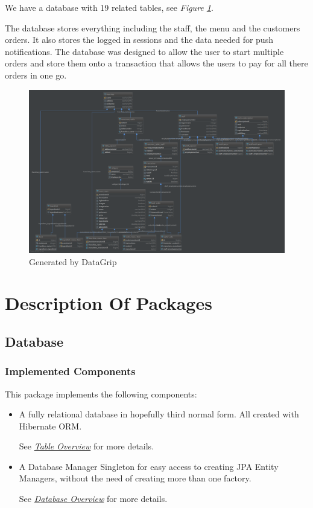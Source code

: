 \documentclass[12pt, twoside, a4paper]{report}
\begin{document}
We have a database with 19 related tables, see \textit{Figure \ref{fig:data}}. 

The database stores everything including the staff, the menu and the customers orders. 
It also stores the logged in sessions and the data needed for push notifications.
The database was designed to allow the user to start multiple orders and store them onto a transaction that allows the users to pay for all there orders in one go.

\begin{figure}[H]
  \centering
  \includegraphics[width=15cm]{database.png}
  \caption{Generated by DataGrip}
  \label{fig:data}
\end{figure}

\chapter*{Description Of Packages}
\section*{Database}\label{sec:database}
\subsection*{Implemented Components}
This package implements the following components:
\begin{itemize}
  \item A fully relational database in hopefully third normal form. All created with Hibernate ORM.

    See \textit{\href{run:../JavaDoc/database/tables/package-summary.html}{Table Overview}} for more details.
  \item A Database Manager Singleton for easy access to creating JPA Entity Managers, without the need of creating more than one factory.

    See \textit{\href{run:../JavaDoc/database/package-summary.html}{Database Overview}} for more details.
\end{itemize}
\end{document}
